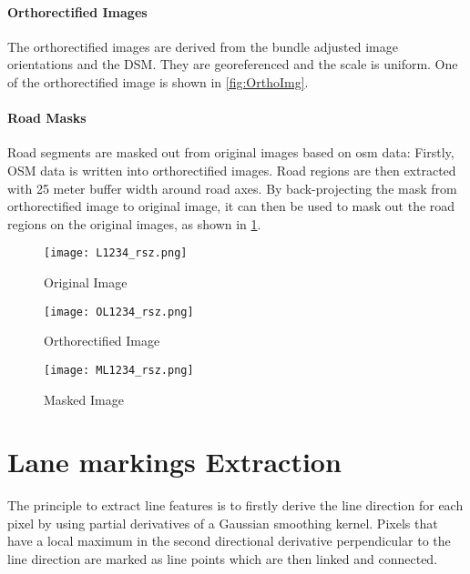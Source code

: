 \paragraph{Orthorectified Images}
The orthorectified images are derived from the bundle adjusted image orientations and the DSM. They are georeferenced and the scale is uniform. One of the orthorectified image is shown in \cref{fig:OrthoImg}.

\paragraph{Road Masks}
Road segments are masked out from original images based on \gls{osm} data: Firstly, OSM data is written into orthorectified images. Road regions are then extracted with 25 meter buffer width around road axes. By back-projecting the mask from orthorectified image to original image, it can then be used to mask out the road regions on the original images, as shown in \cref{fig:MaskedImg}.

\begin{figure}%
  \parbox{.45\linewidth}{
    \centering
    \texttt{[image: L1234\_rsz.png]}
    \caption{Original Image}
    \label{fig:OriImg}
  }
  \hfill
  \parbox{.45\linewidth}{
    \centering
    \texttt{[image: OL1234\_rsz.png]}
    \caption{Orthorectified Image}
    \label{fig:OrthoImg}
  }
    \centering
    \texttt{[image: ML1234\_rsz.png]}
    \caption{Masked Image}
    \label{fig:MaskedImg}
\end{figure}

\clearpage

\section{Lane markings Extraction}
\label{sec:LineExtraction}

The principle to extract line features is to firstly derive the line direction for each pixel by using partial derivatives of a Gaussian smoothing kernel. Pixels that have a local maximum in the second directional derivative perpendicular to the line direction are marked as line points which are then linked and connected.

